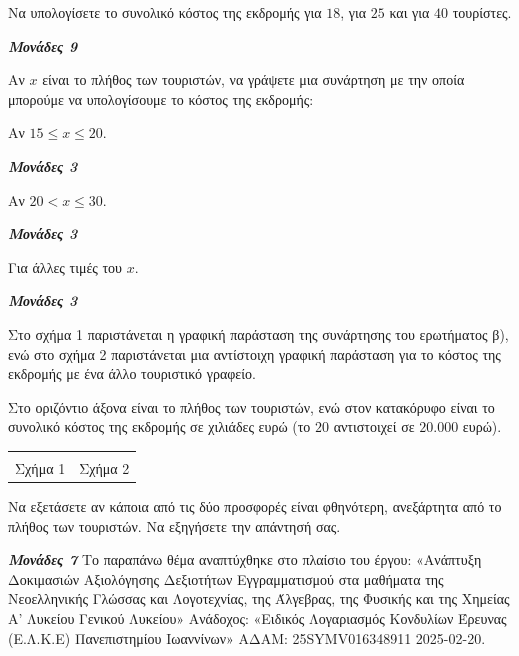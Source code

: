 \documentclass[11pt,a4paper,twoside]{book}
\newcommand{\monades}[1]{
\hspace*{\fill}
\textbf{\textit{\textcolor{maincolor}{Μονάδες #1}}}}
\begin{document}
\begin{alist}
\item Να υπολογίσετε το συνολικό κόστος της εκδρομής για $18$, για $25$ και για $40$ τουρίστες.
\monades{9}
\item Αν $x$ είναι το πλήθος των τουριστών, να γράψετε μια συνάρτηση με την οποία μπορούμε να υπολογίσουμε το κόστος της εκδρομής:

\begin{rlist}
\item Αν $15 \leq x \leq 20$.
\monades{3}
\item Αν $20 < x \leq 30$.
\monades{3}
\item Για άλλες τιμές του $x$.
\monades{3}
\end{rlist}
\item Στο σχήμα 1 παριστάνεται η γραφική παράσταση της συνάρτησης του ερωτήματος β), ενώ στο σχήμα 2 παριστάνεται μια αντίστοιχη γραφική παράσταση για το κόστος της εκδρομής με ένα άλλο τουριστικό γραφείο.

Στο οριζόντιο άξονα είναι το πλήθος των τουριστών, ενώ στον κατακόρυφο είναι το συνολικό κόστος της εκδρομής σε χιλιάδες ευρώ (το $20$ αντιστοιχεί σε $20.000$ ευρώ).

\begin{longtable}[]{@{}
  >{\centering\arraybackslash}p{}
  >{\centering\arraybackslash}p{}@{}}
\noalign{}
\begin{minipage}[b]{\linewidth}\raggedright
\end{minipage} & \begin{minipage}[b]{\linewidth}\raggedright
\end{minipage} \\
\noalign{}

\noalign{}
\endlastfoot
Σχήμα 1 & Σχήμα 2 \\
\end{longtable}

Να εξετάσετε αν κάποια από τις δύο προσφορές είναι φθηνότερη, ανεξάρτητα από το πλήθος των τουριστών. Να εξηγήσετε την απάντησή σας.
\monades{7}
{\footnotesize Το παραπάνω θέμα αναπτύχθηκε στο πλαίσιο του έργου: «Ανάπτυξη Δοκιμασιών Αξιολόγησης Δεξιοτήτων Εγγραμματισμού στα μαθήματα της Νεοελληνικής Γλώσσας και Λογοτεχνίας, της Άλγεβρας, της Φυσικής και της Χημείας Α' Λυκείου Γενικού Λυκείου» Ανάδοχος: «Ειδικός Λογαριασμός Κονδυλίων Έρευνας (Ε.Λ.Κ.Ε) Πανεπιστημίου Ιωαννίνων» ΑΔΑΜ: 25SYMV016348911 2025-02-20.}
\end{alist}
\end{document}
